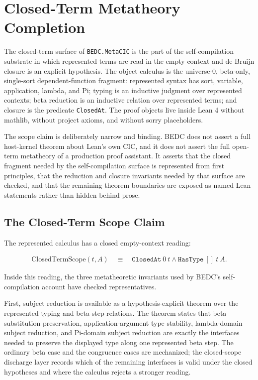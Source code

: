 \section{Closed-Term Metatheory Completion}
\label{sec:closed-term-metatheory-completion}

The closed-term surface of \texttt{BEDC.MetaCIC} is the part of the
self-compilation substrate in which represented terms are read in the empty
context and de Bruijn closure is an explicit hypothesis.  The object calculus
is the universe-$0$, beta-only, single-sort dependent-function fragment:
represented syntax has sort, variable, application, lambda, and Pi; typing is
an inductive judgment over represented contexts; beta reduction is an
inductive relation over represented terms; and closure is the predicate
\texttt{ClosedAt}.  The proof objects live inside Lean 4 without mathlib,
without project axioms, and without sorry placeholders.

The scope claim is deliberately narrow and binding.  BEDC does not assert a
full host-kernel theorem about Lean's own CIC, and it does not assert the full
open-term metatheory of a production proof assistant.  It asserts that the
closed fragment needed by the self-compilation surface is represented from
first principles, that the reduction and closure invariants needed by that
surface are checked, and that the remaining theorem boundaries are exposed as
named Lean statements rather than hidden behind prose.

\subsection{The Closed-Term Scope Claim}
\label{subsec:closed-term-scope-claim}

The represented calculus has a closed empty-context reading:

$$
\begin{aligned}
  \mathrm{ClosedTermScope}(t,A)
  \quad\equiv\quad
  \texttt{ClosedAt}\ 0\ t
  \land
  \texttt{HasType}\ []\ t\ A .
\end{aligned}
$$

Inside this reading, the three metatheoretic invariants used by BEDC's
self-compilation account have checked representatives.

First, subject reduction is available as a hypothesis-explicit theorem over
the represented typing and beta-step relations.  The theorem states that beta
substitution preservation, application-argument type stability, lambda-domain
subject reduction, and Pi-domain subject reduction are exactly the interfaces
needed to preserve the displayed type along one represented beta step.  The
ordinary beta case and the congruence cases are mechanized; the closed-scope
discharge layer records which of the remaining interfaces is valid under the
closed hypotheses and where the calculus rejects a stronger reading.

